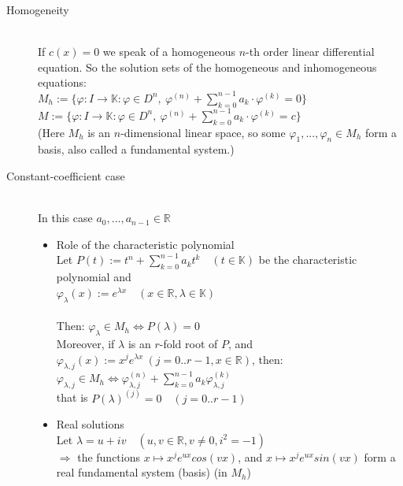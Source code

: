 \documentclass[margin=0px]{article}
\newcommand{\R}{\mathbb{R}}
\begin{document}
\begin{description}
    \item[Homogeneity] \hfill \\
        If $c(x) = 0$ we speak of a homogeneous $n$-th order linear differential equation. So the solution sets of the homogeneous and inhomogeneous equations: \\
        $ M_h := \{\varphi : I \rightarrow \mathbb{K} : \varphi \in D^n, \ \varphi^{(n)} + \sum\limits_{k=0}^{n-1}a_k\cdot\varphi^{(k)} = 0 \} $ \\
        $ M := \{\varphi : I \rightarrow \mathbb{K} : \varphi \in D^n, \ \varphi^{(n)} + \sum\limits_{k=0}^{n-1}a_k\cdot\varphi^{(k)} = c \} $ \\
        (Here $M_h$ is an $n$-dimensional linear space, so some $ \varphi_1,...,\varphi_n \in M_h$ form a basis, also called a fundamental system.)
    \item[Constant-coefficient case] \hfill \\
        In this case $a_0,...,a_{n-1} \in \R$
        \begin{itemize}
            \item Role of the characteristic polynomial \\
                  Let $P(t) := t^n + \sum\limits_{k=0}^{n-1}a_kt^k \quad (t \in \mathbb{K})$ be the characteristic polynomial and \\
                  $ \varphi_\lambda(x) := e^{\lambda x} \quad (x \in \R, \lambda \in \mathbb{K}) $ \\\\
                  Then: $ \varphi_\lambda \in M_h \Longleftrightarrow P(\lambda) = 0 $\\
                  Moreover, if $ \lambda $ is an $r$-fold root of $P$, and \\
                  $ \varphi_{\lambda,j}(x) := x^je^{\lambda x} \ (j = 0..r-1, x\in\R)$, then:
                  $ \varphi_{\lambda,j} \in M_h \Longleftrightarrow \varphi_{\lambda, j}^{(n)}+\sum\limits_{k=0}^{n-1}a_k\varphi_{\lambda, j}^{(k)} $ \\
                  that is $P(\lambda)^{(j)} = 0 \quad (j = 0..r-1)$
            \item Real solutions \\
                  Let $ \lambda = u+iv \quad (u,v \in \R, v\neq0, i^2 = -1) $ \\
                  $ \Rightarrow $ the functions $ x \mapsto x^je^{ux}cos(vx)$, and $x \mapsto x^je^{ux}sin(vx)$ form a real fundamental system (basis) (in $M_h$)
        \end{itemize}

\end{description}
\end{document}

